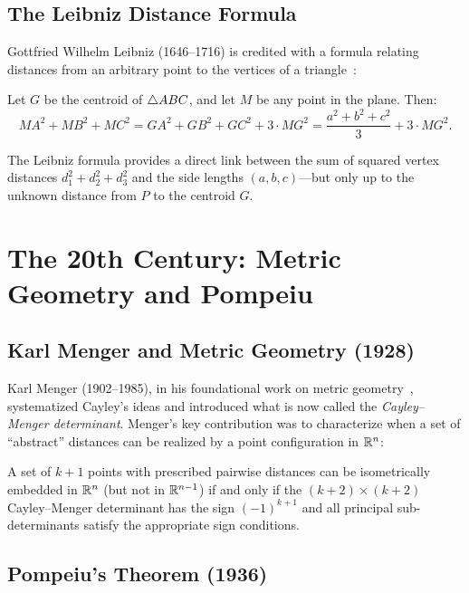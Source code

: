 \subsection{The Leibniz Distance Formula}

Gottfried Wilhelm Leibniz (1646--1716) is credited with a formula relating distances from an arbitrary point to the vertices of a triangle~\citep{berger2009geometry}:
\begin{theorem}
\label{thm:leibniz-hist}
Let $G$ be the centroid of $\triangle ABC$, and let $M$ be any point in the plane. Then:
\begin{equation}
MA^2 + MB^2 + MC^2 = GA^2 + GB^2 + GC^2 + 3 \cdot MG^2 = \frac{a^2 + b^2 + c^2}{3} + 3 \cdot MG^2.
\end{equation}
\end{theorem}

The Leibniz formula provides a direct link between the sum of squared vertex distances $d_1^2 + d_2^2 + d_3^2$ and the side lengths $(a, b, c)$---but only up to the unknown distance from $P$ to the centroid $G$.

\section{The 20th Century: Metric Geometry and Pompeiu}

\subsection{Karl Menger and Metric Geometry (1928)}
\label{sec:menger-hist}

Karl Menger (1902--1985), in his foundational work on metric geometry~\citep{menger1928}, systematized Cayley's ideas and introduced what is now called the \emph{Cayley--Menger determinant}. Menger's key contribution was to characterize when a set of ``abstract'' distances can be realized by a point configuration in $\mathbb{R}^n$:

\begin{theorem}
A set of $k+1$ points with prescribed pairwise distances can be isometrically embedded in $\mathbb{R}^n$ (but not in $\mathbb{R}^{n-1}$) if and only if the $(k+2) \times (k+2)$ Cayley--Menger determinant has the sign $(-1)^{k+1}$ and all principal sub-determinants satisfy the appropriate sign conditions.
\end{theorem}

\subsection{Pompeiu's Theorem (1936)}
\label{sec:pompeiu-hist}

